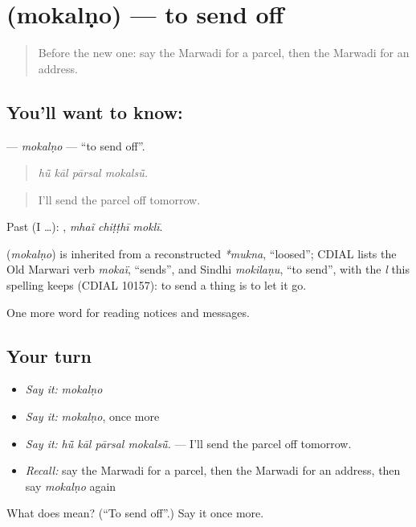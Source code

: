 \section[\texorpdfstring{\mw{मोकलणो} (mokalṇo)}{मोकलणो (mokalṇo)}]{ (mokalṇo) — to send off}

\label{lesson:MW-C196-mokalno}



\begin{quote}
Before the new one: say the Marwadi for a parcel, then the Marwadi for an address.
\end{quote}

\subsection*{You'll want to know: }
\textbf{} — \emph{mokalṇo} — \textquotedblleft{}to send off\textquotedblright{}.

\begin{quote}
   
\end{quote}

\begin{quote}
\emph{hū̃ kāl pārsal mokalsū̃.}
\end{quote}

\begin{quote}
I'll send the parcel off tomorrow.
\end{quote}

Past (I …):   , \emph{mhaĩ chiṭṭhī moklī}.

\begin{cousinweb}
\textbf{} (\emph{mokalṇo}) is inherited from a reconstructed \emph{*mukna}, \textquotedblleft{}loosed\textquotedblright{}; CDIAL lists the Old Marwari verb \emph{mokaï}, \textquotedblleft{}sends\textquotedblright{}, and Sindhi \emph{mokilaṇu}, \textquotedblleft{}to send\textquotedblright{}, with the \emph{l} this spelling keeps (CDIAL 10157): to send a thing is to let it go.
\end{cousinweb}

\begin{grammarlens}[title={What you've built}]
One more word for reading notices and messages.
\end{grammarlens}

\subsection*{Your turn}
\begin{itemize}
\raggedright
  \item \emph{Say it:} \emph{mokalṇo}
  \item \emph{Say it:} \emph{mokalṇo}, once more
  \item \emph{Say it:} \emph{hū̃ kāl pārsal mokalsū̃.} — I'll send the parcel off tomorrow.
  \item \emph{Recall:} say the Marwadi for a parcel, then the Marwadi for an address, then say \emph{mokalṇo} again
\end{itemize}

\begin{tcolorbox}[breakable,colback=teal!4,colframe=teal!35!black,title={Before you move on}]
What does  mean? (\textquotedblleft{}To send off\textquotedblright{}.) Say it once more.
\end{tcolorbox}
